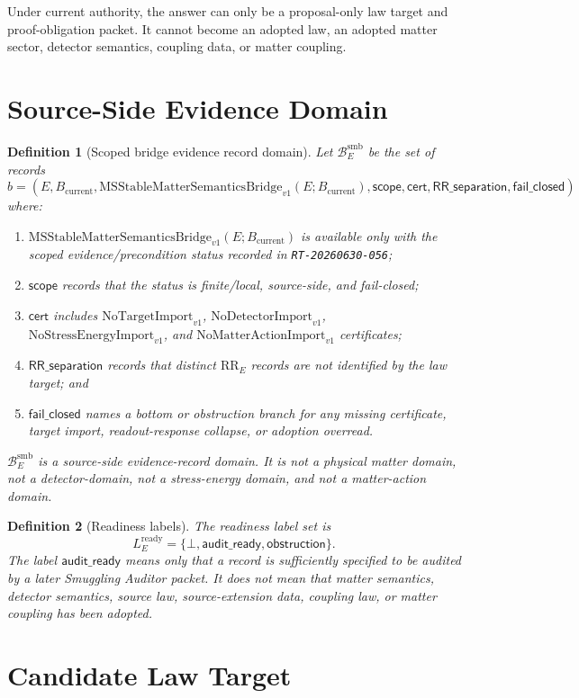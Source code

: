 \documentclass[11pt]{article}
\newcommand{\Bcur}{B_{\mathrm{current}}}
\newcommand{\MSBridge}{\mathrm{MSStableMatterSemanticsBridge}_{v1}}
\newcommand{\BridgeDom}{\mathcal B^{\mathrm{smb}}_E}
\newcommand{\AuditReady}{\mathsf{audit\_ready}}
\newcommand{\Obstruction}{\mathsf{obstruction}}
\newcommand{\Bottom}{\bot}
\newcommand{\NoTarget}{\mathrm{NoTargetImport}_{v1}}
\newcommand{\NoDetector}{\mathrm{NoDetectorImport}_{v1}}
\newcommand{\NoSE}{\mathrm{NoStressEnergyImport}_{v1}}
\newcommand{\NoAction}{\mathrm{NoMatterActionImport}_{v1}}
\newtheorem{definition}{Definition}
\begin{document}
Under current authority, the answer can only be a proposal-only law target
and proof-obligation packet. It cannot become an adopted law, an adopted
matter sector, detector semantics, coupling data, or matter coupling.

\section{Source-Side Evidence Domain}

\begin{definition}[Scoped bridge evidence record domain]
Let \(\BridgeDom\) be the set of records
\[
  b=(E,\Bcur,\MSBridge(E;\Bcur),\mathsf{scope},\mathsf{cert},
      \mathsf{RR\_separation},\mathsf{fail\_closed})
\]
where:
\begin{enumerate}[leftmargin=*]
  \item \(\MSBridge(E;\Bcur)\) is available only with the scoped
  evidence/precondition status recorded in \texttt{RT-20260630-056};
  \item \(\mathsf{scope}\) records that the status is finite/local,
  source-side, and fail-closed;
  \item \(\mathsf{cert}\) includes \(\NoTarget\), \(\NoDetector\),
  \(\NoSE\), and \(\NoAction\) certificates;
  \item \(\mathsf{RR\_separation}\) records that distinct
  \(\mathrm{RR}_E\) records are not identified by the law target; and
  \item \(\mathsf{fail\_closed}\) names a bottom or obstruction branch for
  any missing certificate, target import, readout-response collapse, or
  adoption overread.
\end{enumerate}
\(\BridgeDom\) is a source-side evidence-record domain. It is not a physical
matter domain, not a detector-domain, not a stress-energy domain, and not a
matter-action domain.
\end{definition}

\begin{definition}[Readiness labels]
The readiness label set is
\[
  L_E^{\mathrm{ready}}
  =
  \{\Bottom,\AuditReady,\Obstruction\}.
\]
The label \(\AuditReady\) means only that a record is sufficiently specified
to be audited by a later Smuggling Auditor packet. It does not mean that
matter semantics, detector semantics, source law, source-extension data,
coupling law, or matter coupling has been adopted.
\end{definition}

\section{Candidate Law Target}
\end{document}
